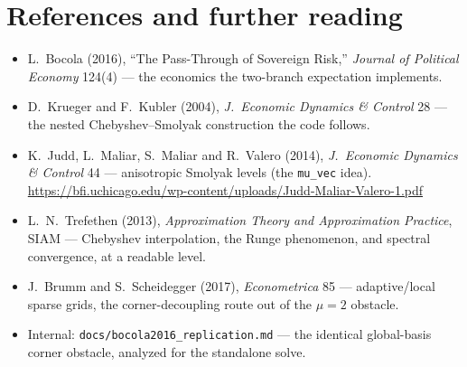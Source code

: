 \documentclass[11pt]{article}
\newcommand{\code}[1]{\texttt{#1}}
\begin{document}
\section*{References and further reading}
\small
\begin{itemize}
\item L.\ Bocola (2016), ``The Pass-Through of Sovereign Risk,''
      \emph{Journal of Political Economy} 124(4) --- the economics the
      two-branch expectation implements.
\item D.\ Krueger and F.\ Kubler (2004), \emph{J.\ Economic Dynamics \&
      Control} 28 --- the nested Chebyshev--Smolyak construction the code
      follows.
\item K.\ Judd, L.\ Maliar, S.\ Maliar and R.\ Valero (2014), \emph{J.\
      Economic Dynamics \& Control} 44 --- anisotropic Smolyak levels (the
      \code{mu\_vec} idea).
      \url{https://bfi.uchicago.edu/wp-content/uploads/Judd-Maliar-Valero-1.pdf}
\item L.\ N.\ Trefethen (2013), \emph{Approximation Theory and Approximation
      Practice}, SIAM --- Chebyshev interpolation, the Runge phenomenon, and
      spectral convergence, at a readable level.
\item J.\ Brumm and S.\ Scheidegger (2017), \emph{Econometrica} 85 ---
      adaptive/local sparse grids, the corner-decoupling route out of the
      $\mu=2$ obstacle.
\item Internal: \code{docs/bocola2016\_replication.md} --- the identical
      global-basis corner obstacle, analyzed for the standalone solve.
\end{itemize}
\end{document}
